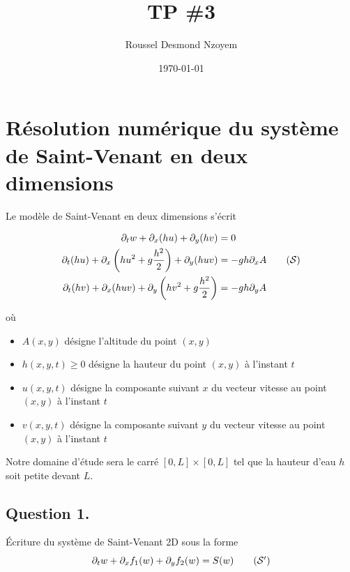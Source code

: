\documentclass[
	french,
	11pt, %
]{fphw}
\title{TP \#3} %
\author{Roussel Desmond Nzoyem} %
\date{\today} %
\institute{Université de Strasbourg \\ UFR de Mathématiques et Informatique} %
\begin{document}
\maketitle %



\section*{Résolution numérique du système de Saint-Venant en deux dimensions}

Le modèle de Saint-Venant en deux dimensions s'écrit 

\begin{align*}
	\partial_t w + \partial_x (hu) + \partial_y(hv)  &=0 \\
	\partial_t(hu) + \partial_x \left(hu^2 + g\frac{h^2}{2} \right) + \partial_y(huv) &= -gh \partial_x A \tag{$\mathcal{S}$}\\ 
	\partial_t(hv) + \partial_x(huv) + \partial_y \left(hv^2 + g\frac{h^2}{2} \right) &= -gh \partial_y A 
	\label{eq:stVenant2D}
\end{align*}

où 
\begin{itemize}
	\item $A(x,y)$ désigne l'altitude du point $(x,y)$
	\item $h(x,y,t) \geq 0$ désigne la hauteur du point $(x,y)$ à l'instant $t$
	\item $u(x,y,t)$ désigne la composante suivant $x$ du vecteur vitesse au point $(x,y)$ à l'instant $t$
	\item $v(x,y,t)$ désigne la composante suivant $y$ du vecteur vitesse au point $(x,y)$ à l'instant $t$
\end{itemize}


Notre domaine d'étude sera le carré $[0,L]\times[0,L]$ tel que la hauteur d’eau $h$ soit petite devant $L$.


\subsection*{Question 1.}

\begin{problem}
Écriture du système de Saint-Venant 2D sous la forme 
\begin{equation}
	\partial_t w + \partial_x f_1(w) + \partial_y f_2(w) = S(w) \tag{$\mathcal{S}'$}	
\end{equation}
\end{problem}
\end{document}
